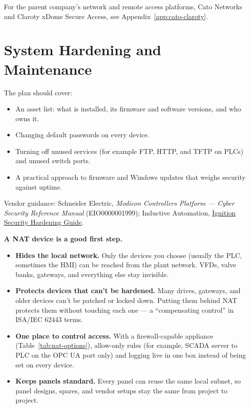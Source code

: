 For the parent company's network and remote access platforms, Cato Networks and Claroty xDome Secure Access, see Appendix~\ref{app:cato-claroty}.

\section{System Hardening and Maintenance}\label{sec:hardening}

The plan should cover:
\begin{itemize}[itemsep=1pt]
  \item An asset list: what is installed, its firmware and software versions, and who owns it.
  \item Changing default passwords on every device.
  \item Turning off unused services (for example FTP, HTTP, and TFTP on PLCs) and unused switch ports.
  \item A practical approach to firmware and Windows updates that weighs security against uptime.
\end{itemize}
Vendor guidance: Schneider Electric, \emph{Modicon Controllers Platform --- Cyber Security Reference Manual} (EIO0000001999); Inductive Automation, \href{https://inductiveautomation.com/resources/article/ignition-security-hardening-guide}{Ignition Security Hardening Guide}.

\textbf{A NAT device is a good first step.}
\begin{itemize}[itemsep=1pt]
  \item \textbf{Hides the local network.} Only the devices you choose (usually the PLC, sometimes the HMI) can be reached from the plant network. VFDs, valve banks, gateways, and everything else stay invisible.
  \item \textbf{Protects devices that can't be hardened.} Many drives, gateways, and older devices can't be patched or locked down. Putting them behind NAT protects them without touching each one --- a ``compensating control'' in ISA/IEC 62443 terms.
  \item \textbf{One place to control access.} With a firewall-capable appliance (Table~\ref{tab:nat-options}), allow-only rules (for example, SCADA server to PLC on the OPC UA port only) and logging live in one box instead of being set on every device.
  \item \textbf{Keeps panels standard.} Every panel can reuse the same local subnet, so panel designs, spares, and vendor setups stay the same from project to project.
\end{itemize}

